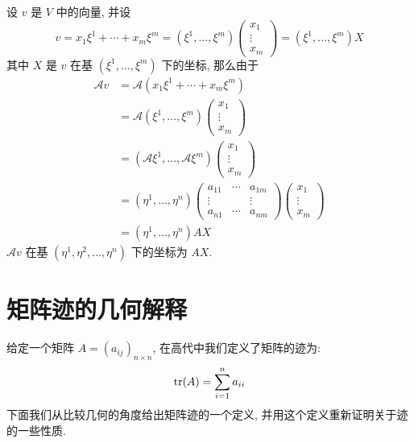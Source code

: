 \documentclass{book}
\begin{document}
        设 $v$ 是 $V$ 中的向量, 并设
        \begin{equation*}
            v=x_1\xi^1+\cdots+x_m\xi^m=(\xi^1,\dots,\xi^m)
            \begin{pmatrix}
                x_1 \\
                \vdots \\
                x_m
            \end{pmatrix}=(\xi^1,\dots,\xi^m)X
        \end{equation*}
        其中 $X$ 是 $v$ 在基 $(\xi^1,\dots,\xi^m)$ 下的坐标, 那么由于
        \begin{align*}
            \mathcal{A}v &=\mathcal{A}(x_1\xi^1+\cdots+x_m\xi^m) \\
            &=\mathcal{A}(\xi^1,\dots,\xi^m)
            \begin{pmatrix}
                x_1 \\
                \vdots \\
                x_m
            \end{pmatrix} \\
            &=(\mathcal{A}\xi^1,\dots,\mathcal{A}\xi^m)
            \begin{pmatrix}
                x_1 \\
                \vdots \\
                x_m
            \end{pmatrix} \\
            & = (\eta^1,\dots,\eta^n)
            \begin{pmatrix}
                a_{11} & \cdots & a_{1m} \\
                \vdots &        & \vdots \\
                a_{n1} & \cdots & a_{nm}
            \end{pmatrix}
            \begin{pmatrix}
                x_1 \\
                \vdots \\
                x_m
            \end{pmatrix} \\
            & = (\eta^1,\dots,\eta^n)AX
        \end{align*}
        $\mathcal{A}v$ 在基 $(\eta^1,\eta^2,\dots,\eta^n)$ 下的坐标为 $AX$.
 
    \section{矩阵迹的几何解释}
        给定一个矩阵 $A = (a_{ij})_{n\times n}$, 在高代中我们定义了矩阵的迹为:
        \begin{equation*}
            {\rm tr}(A) = \sum_{i = 1}^{n}a_{ii}
        \end{equation*}
        下面我们从比较几何的角度给出矩阵迹的一个定义, 并用这个定义重新证明关于迹的一些性质.
\end{document}
